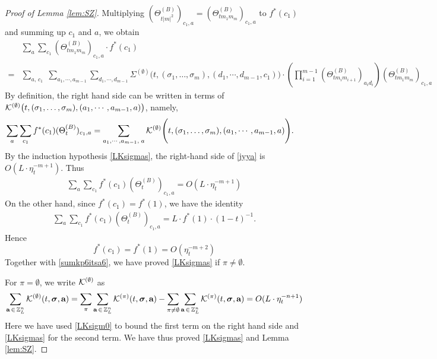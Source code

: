 \documentclass[10pt,reqno]{article}
\theoremstyle{plain} %
\theoremstyle{remark}
\numberwithin{equation}{section}
\begin{document}
\begin{proof}[ Proof of Lemma  \ref{lem:SZ}]
Multiplying  $(\Theta^{(B)}_{t|m|^2})_{c_1,a}=(\Theta^{(B)}_{tm_1m_m})_{c_1,a}$ to   $f^*(c_1)$ and summing up $c_1$ and $a$,  we obtain 
\begin{align}\label{sumkp7itsa7}
   & \sum_{a}\sum_{c_1}(\Theta^{(B) }_{tm_1m_m})_{c_1 ,a}\cdot f^*(c_1)
    \\\nonumber
     =& \sum_{a,\,c_1}\;\sum_{a_1,\cdots, a_{m-1}}\sum_{d_1,\cdots, d_{m-1}}\Sigma^{(\emptyset)}\Bigg(t, (\sigma_1,\ldots,\sigma_m), (d_1,\cdots, d_{m-1}, c_1)\Bigg)\cdot  \left(\prod_{i=1}^{m-1}\left(\Theta^{(B)}_{tm_im_{i+1}}\right)_{a_id_i}\right)(\Theta^{(B) }_{tm_1m_m})_{c_1 ,a} 
\end{align}
By definition, the right hand side  can be written in terms of  ${\cal K}^{(\emptyset)} \big(t, (\sigma_1,\ldots,\sigma_m), (a_1,\cdots, a_{m-1}, a)\big)$, namely, 
\begin{align}\label{jyya}
 \sum_a\sum_{c_1}f^*(c_1)(\Theta^{(B) }_t)_{c_1,a}&=\sum_{a_1,\cdots, a_{m-1},\;a}{\cal K}^{(\emptyset)} \Bigg(t, (\sigma_1,\ldots,\sigma_m), (a_1,\cdots, a_{m-1}, a)\Bigg) .
\end{align}
By the induction hypothesis \eqref{LKsigmas}, the right-hand side of \eqref{jyya} is $O(L\cdot\eta_t^{-m+1})$. Thus
\begin{align}\label{jyasdfya}
\sum_a\sum_{c_1}f^*(c_1)(\Theta^{(B) }_t)_{c_1,a} = O(L\cdot\eta_t^{-m+1})
\end{align}
On the other hand, since $f^*(c_1)=f^*(1)$, we have the identity 
\begin{align}
\sum_a\sum_{c_1}f^*(c_1)(\Theta^{(B) }_t)_{c_1,a}=L\cdot f^*(1)\cdot (1-t)^{-1}.
\end{align}
Hence
 $$
  f^*(c_1)=f^*(1)=O(\eta_t^{-m+2}) $$
Together with \eqref{sumkp6itsa6}, we have proved   \eqref{LKsigmas}  if  $\pi\ne \emptyset$.  


For  $\pi=\emptyset$, we write ${\cal K}^{(\emptyset)}$  as
\begin{align}\label{LKsigmasES}
 \sum_{\textbf{a}\,\in \,\mathbb Z^{n}_L } 
{\cal K}^{(\emptyset)}(t, \boldsymbol{\sigma}, \textbf{a})
=
 \sum_{\pi}\sum_{\textbf{a}\,\in \,\mathbb Z^{n}_L } 
{\cal K}^{(\pi)}(t, \boldsymbol{\sigma}, \textbf{a})
-
\sum_{\pi\ne\emptyset}  \sum_{\textbf{a}\,\in \,\mathbb Z^{n}_L } 
{\cal K}^{(\pi)}(t, \boldsymbol{\sigma}, \textbf{a}) 
=
  O(L\cdot \eta_{t}^{-n+1}) 
\end{align}
Here  we have used \eqref{LKsigm0} to bound the first term on the right hand side and  \eqref{LKsigmas} for the second term. 
We  have thus proved  \eqref{LKsigmas} and Lemma \ref{lem:SZ}. 
 
\end{proof} 
\end{document}
